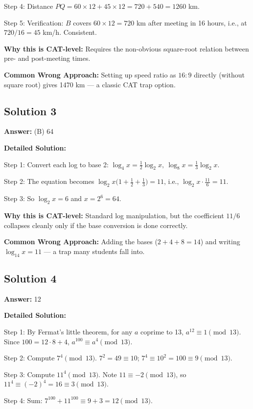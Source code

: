 \documentclass[11pt]{article}
\begin{document}
Step 4: Distance \(PQ = 60 \times 12 + 45 \times 12 = 720 + 540 = 1260\) km.

Step 5: Verification: \(B\) covers \(60 \times 12 = 720\) km after meeting in 16 hours, i.e., at \(720/16 = 45\) km/h. Consistent.

\textbf{Why this is CAT-level:} Requires the non-obvious square-root relation between pre- and post-meeting times.

\textbf{Common Wrong Approach:} Setting up speed ratio as \(16:9\) directly (without square root) gives 1470 km — a classic CAT trap option.

\subsection*{Solution 3}
\textbf{Answer:} (B) 64

\textbf{Detailed Solution:}

Step 1: Convert each log to base 2: \(\log_{4}x = \frac{1}{2}\log_{2}x,\ \log_{8}x = \frac{1}{3}\log_{2}x\).

Step 2: The equation becomes \(\log_{2}x\Big(1 + \tfrac{1}{2} + \tfrac{1}{3}\Big) = 11\), i.e., \(\log_{2}x \cdot \tfrac{11}{6} = 11\).

Step 3: So \(\log_{2}x = 6\) and \(x = 2^{6} = 64\).

\textbf{Why this is CAT-level:} Standard log manipulation, but the coefficient \(11/6\) collapses cleanly only if the base conversion is done correctly.

\textbf{Common Wrong Approach:} Adding the bases (\(2 + 4 + 8 = 14\)) and writing \(\log_{14}x = 11\) — a trap many students fall into.

\subsection*{Solution 4}
\textbf{Answer:} 12

\textbf{Detailed Solution:}

Step 1: By Fermat's little theorem, for any \(a\) coprime to 13, \(a^{12} \equiv 1 \pmod{13}\). Since \(100 = 12 \cdot 8 + 4\), \(a^{100} \equiv a^{4} \pmod{13}\).

Step 2: Compute \(7^{4} \pmod{13}\). \(7^{2} = 49 \equiv 10\); \(7^{4} \equiv 10^{2} = 100 \equiv 9 \pmod{13}\).

Step 3: Compute \(11^{4} \pmod{13}\). Note \(11 \equiv -2 \pmod{13}\), so \(11^{4} \equiv (-2)^{4} = 16 \equiv 3 \pmod{13}\).

Step 4: Sum: \(7^{100} + 11^{100} \equiv 9 + 3 = 12 \pmod{13}\).
\end{document}
